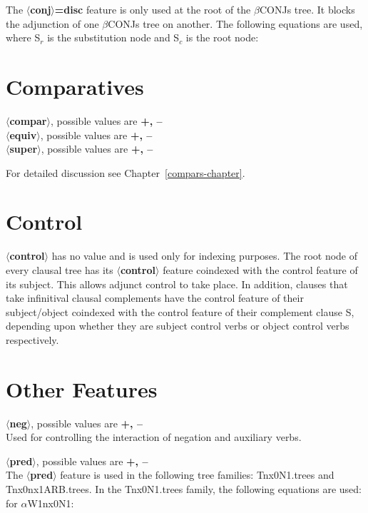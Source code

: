 The {\bf $\langle$conj$\rangle$=disc} feature is only used at the root
of  the
$\beta$CONJs tree.  It blocks the adjunction of one $\beta$CONJs tree
on another.  The following equations are used, where S$_{r}$ is
the substitution node and S$_{c}$ is the root node:


\section{Comparatives}
{\bf $\langle$compar$\rangle$}, possible values are {\bf +, --}\\
{\bf $\langle$equiv$\rangle$}, possible values are {\bf +, --}\\
{\bf $\langle$super$\rangle$}, possible values are {\bf +, --}

For detailed discussion see Chapter~\ref{compars-chapter}.

\section{Control}
{\bf $\langle$control$\rangle$} has no value and is used only for indexing
purposes.  The root node of every clausal tree has its {\bf
$\langle$control$\rangle$} feature coindexed with the control feature of
its subject.  This allows adjunct control to take place. In addition,
clauses that take infinitival clausal complements have the control feature
of their subject/object coindexed with the control feature of their
complement clause S, depending upon whether they are subject control verbs
or object control verbs respectively.


\section{Other Features}
{\bf $\langle$neg$\rangle$}, possible values are {\bf +, --}\\
Used for controlling the interaction of negation and auxiliary verbs.

\noindent
{\bf $\langle$pred$\rangle$}, possible values are {\bf +, --}\\
The {\bf $\langle$pred$\rangle$} feature is used in the following tree
families: Tnx0N1.trees and Tnx0nx1ARB.trees.
In the Tnx0N1.trees family, the following equations are used:\\
for $\alpha$W1nx0N1:


